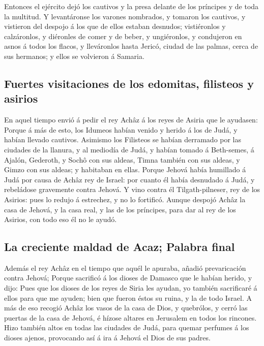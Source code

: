  Entonces el ejército dejó los cautivos y la presa
delante de los príncipes y de toda la multitud.  Y
levantáronse los varones nombrados, y tomaron los cautivos, y vistieron
del despojo á los que de ellos estaban desnudos; vistiéronlos y
calzáronlos, y diéronles de comer y de beber, y ungiéronlos, y
condujeron en asnos á todos los flacos, y lleváronlos hasta Jericó,
ciudad de las palmas, cerca de sus hermanos; y ellos se volvieron á
Samaria.

\hypertarget{fuertes-visitaciones-de-los-edomitas-filisteos-y-asirios}{%
\subsection{Fuertes visitaciones de los edomitas, filisteos y
asirios}\label{fuertes-visitaciones-de-los-edomitas-filisteos-y-asirios}}

 En aquel tiempo envió á pedir el rey Achâz á los reyes
de Asiria que le ayudasen:  Porque á más de esto, los
Idumeos habían venido y herido á los de Judá, y habían llevado cautivos.
 Asimismo los Filisteos se habían derramado por las
ciudades de la llanura, y al mediodía de Judá, y habían tomado á
Beth-semes, á Ajalón, Gederoth, y Sochô con sus aldeas, Timna también
con sus aldeas, y Gimzo con sus aldeas; y habitaban en ellas.
 Porque Jehová había humillado á Judá por causa de Achâz
rey de Israel: por cuanto él había desnudado á Judá, y rebeládose
gravemente contra Jehová.  Y vino contra él
Tilgath-pilneser, rey de los Asirios: pues lo redujo á estrechez, y no
lo fortificó.  Aunque despojó Achâz la casa de Jehová, y
la casa real, y las de los príncipes, para dar al rey de los Asirios,
con todo eso él no le ayudó.

\hypertarget{la-creciente-maldad-de-acaz-palabra-final}{%
\subsection{La creciente maldad de Acaz; Palabra
final}\label{la-creciente-maldad-de-acaz-palabra-final}}

 Además el rey Achâz en el tiempo que aquél le apuraba,
añadió prevaricación contra Jehová;  Porque sacrificó á
los dioses de Damasco que le habían herido, y dijo: Pues que los dioses
de los reyes de Siria les ayudan, yo también sacrificaré á ellos para
que me ayuden; bien que fueron éstos su ruina, y la de todo Israel.
 A más de eso recogió Achâz los vasos de la casa de Dios,
y quebrólos, y cerró las puertas de la casa de Jehová, é hízose altares
en Jerusalem en todos los rincones.  Hizo también altos
en todas las ciudades de Judá, para quemar perfumes á los dioses ajenos,
provocando así á ira á Jehová el Dios de sus padres.

